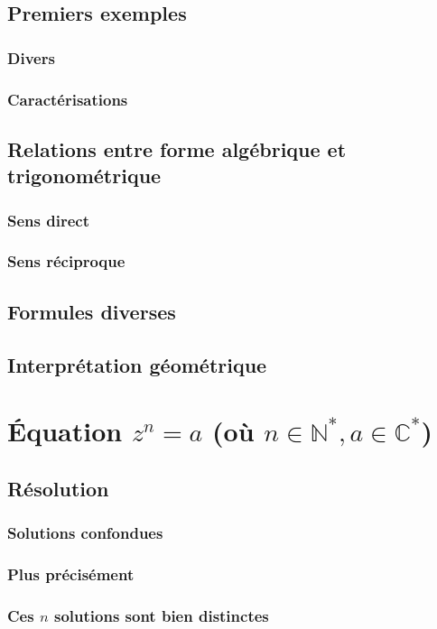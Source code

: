 \documentclass[12pt,a4paper,french]{book}
\begin{document}
		\subsection{Premiers exemples}
			\subsubsection{Divers}
			\subsubsection{Caractérisations}
		\subsection{Relations entre forme algébrique et trigonométrique}
			\subsubsection{Sens direct}
			\subsubsection{Sens réciproque}
		\subsection{Formules diverses}
		\subsection{Interprétation géométrique}
	\section{Équation $z^{n}=a$ (où $n\in \mathbb{N}^{\ast},a\in \mathbb{C}^{\ast}$)}
		\subsection{Résolution}
			\subsubsection{Solutions confondues}
			\subsubsection{Plus précisément}
			\subsubsection{Ces $n$ solutions sont bien distinctes}
\end{document}
